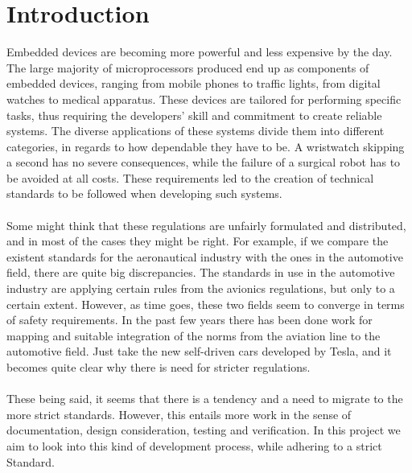\chapter{Introduction}\label{ch:introduction} 

Embedded devices are becoming more powerful and less expensive by the day. The large majority of
microprocessors produced end up as components of embedded devices, ranging from mobile phones
to traffic lights, from digital watches to medical apparatus. These devices are tailored for 
performing specific tasks, thus requiring the developers' skill and commitment to create reliable
systems. The diverse applications of these systems divide them into different categories, in regards to
how dependable they have to be. A wristwatch skipping a second has no severe consequences, while the
failure of a surgical robot has to be avoided at all costs. These requirements led to the creation 
of technical standards to be followed when developing such systems. 
\\\\
Some might think that these regulations are unfairly formulated and distributed, and in most
of the cases they might be right. For example, if we compare the existent standards for the aeronautical industry with the ones in the automotive field, there are quite big discrepancies. The standards 
in use in the automotive industry are applying certain rules from the avionics regulations, 
but only to a certain extent.
However, as time goes, these two fields seem to converge in terms of safety requirements. 
In the past few years there has been done work for mapping and suitable integration 
of the norms from the aviation line to the automotive field. Just take the new self-driven 
cars developed by Tesla, and it becomes quite clear why there is need for stricter regulations. 
\\\\
These being said, it seems that there is a tendency and a need to migrate to the more strict standards. 
However, this entails more work in the sense of documentation, design consideration, testing and verification.
In this project we aim to look into this kind of development process, while adhering to a strict 
Standard.

